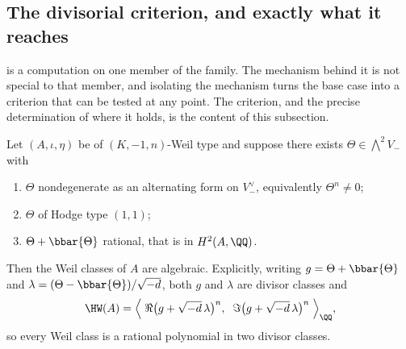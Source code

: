 \subsection{The divisorial criterion, and exactly what it reaches}
\label{ssec:divcrit}

 is a computation on one member of the family. The
mechanism behind it is not special to that member, and isolating the mechanism
turns the base case into a criterion that can be tested at any point. The
criterion, and the precise determination of where it holds, is the content of
this subsection.

\begin{theorem}\label{thm:divcriterion}
Let $(A,\iota,\eta)$ be of $(K,-1,n)$-Weil type and suppose there exists
$\Theta\in\bigwedge^{2}V_{-}$ with
\begin{enumerate}[label=\textup{(\roman*)},nosep]
\item $\Theta$ nondegenerate as an alternating form on $V_{-}^{\vee}$,
  equivalently $\Theta^{n}\ne0$;
\item $\Theta$ of Hodge type $(1,1)$;
\item $\Theta+\bbar{\Theta}$ rational, that is in $H^{2}(A,\QQ)$.
\end{enumerate}
Then the Weil classes of $A$ are algebraic. Explicitly, writing
$g=\Theta+\bbar{\Theta}$ and $\lambda=(\Theta-\bbar{\Theta})/\sqrt{-d}$, both
$g$ and $\lambda$ are divisor classes and
\begin{equation}\label{eq:divrep}
  \HW(A)=\Bigl\langle\;
    \Re\bigl(g+\sqrt{-d}\,\lambda\bigr)^{n},\;\;
    \Im\bigl(g+\sqrt{-d}\,\lambda\bigr)^{n}\;\Bigr\rangle_{\QQ},
\end{equation}
so every Weil class is a rational polynomial in two divisor classes.
\end{theorem}

